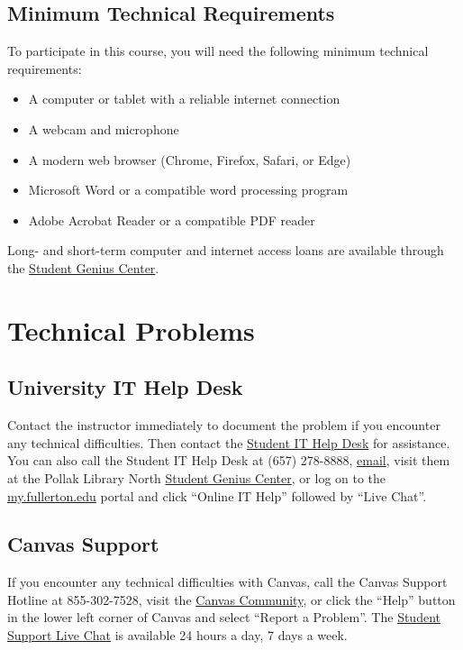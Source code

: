 \documentclass[11pt, letterpaper]{article}
\begin{document}
\subsection*{Minimum Technical Requirements}

To participate in this course, you will need the following minimum technical requirements:
\begin{itemize}
    \item A computer or tablet with a reliable internet connection
    \item A webcam and microphone
    \item A modern web browser (Chrome, Firefox, Safari, or Edge)
    \item Microsoft Word or a compatible word processing program
    \item Adobe Acrobat Reader or a compatible PDF reader
\end{itemize}


\noindent Long- and short-term computer and internet access loans are available through the \href{http://www.fullerton.edu/it/students/sgc/index.php}{Student Genius Center}.

\section{Technical Problems}

\subsection*{University IT Help Desk}

Contact the instructor immediately to document the problem if you encounter any technical difficulties. Then contact the \href{http://www.fullerton.edu/it/students/helpdesk/index.php}{Student IT Help Desk} for assistance. You can also call the Student IT Help Desk at (657) 278-8888, \href{mailto:StudentITHelpDesk@fullerton.edu}{email}, visit them at the Pollak Library North \href{http://www.fullerton.edu/it/students/sgc/index.php}{Student Genius Center}, or log on to the \href{http://my.fullerton.edu/}{my.fullerton.edu} portal and click ``Online IT Help'' followed by ``Live Chat''.

\subsection*{Canvas Support}

If you encounter any technical difficulties with Canvas, call the Canvas Support Hotline at 855-302-7528, visit the \href{https://community.canvaslms.com/docs/DOC-10720-67952720329}{Canvas Community}, or click the ``Help'' button in the lower left corner of Canvas and select ``Report a Problem''. The \href{https://cases.canvaslms.com/liveagentchat?chattype=student&sfid=001A000000YzcwQIAR}{Student Support Live Chat} is available 24 hours a day, 7 days a week.
\end{document}
